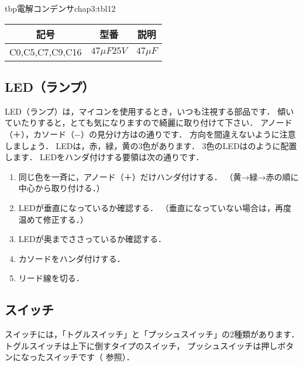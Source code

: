 \begin{mytable}{tbp}{電解コンデンサ}{chap3:tbl12}
{\small\begin{tabular}{l|l|l}
\hline
\hline
\multicolumn{1}{c|}{記号} &
\multicolumn{1}{c|}{型番} &
\multicolumn{1}{c}{説明} \\
\hline
C0,C5,C7,C9,C16 & $ 47 \mu F  25V $ & $ 47 \mu F$ \\
\end{tabular}}
\end{mytable}


\subsection{LED（ランプ）}
LED（ランプ）は，マイコンを使用するとき，いつも注視する部品です．
傾いていたりすると，とても気になりますので綺麗に取り付けて下さい．
アノード（＋），カソード（−）の見分け方はの通りです．
方向を間違えないように注意しましょう．
LEDは，赤，緑，黄の3色があります．
3色のLEDはのように配置します．
LEDをハンダ付けする要領は次の通りです．

\begin{enumerate}
\item 同じ色を一斉に，アノード（＋）だけハンダ付けする．
（黄→緑→赤の順に中心から取り付ける．）
\item LEDが垂直になっているか確認する．
（垂直になっていない場合は，再度温めて修正する．）
\item LEDが奥までささっているか確認する．
\item カソードをハンダ付けする．
\item リード線を切る．
\end{enumerate}


\subsection{スイッチ}


スイッチには，「トグルスイッチ」と「プッシュスイッチ」の2種類があります．
トグルスイッチは上下に倒すタイプのスイッチ，
プッシュスイッチは押しボタンになったスイッチです（ 参照）．

